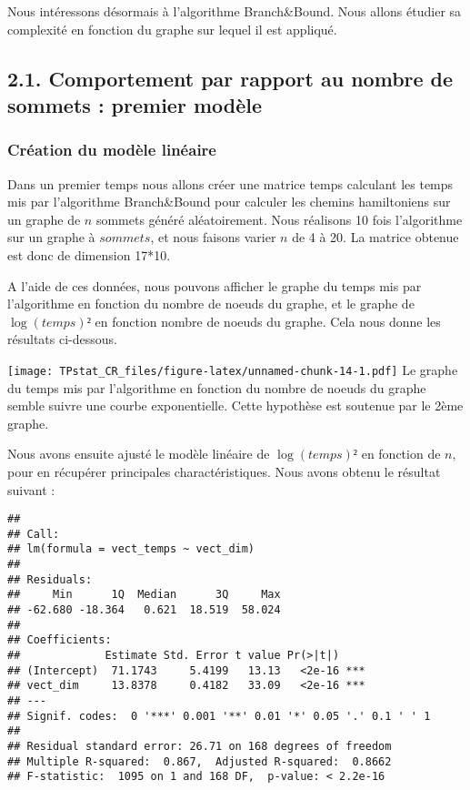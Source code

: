 \documentclass[
]{article}
\begin{document}
Nous intéressons désormais à l'algorithme Branch\&Bound. Nous allons
étudier sa complexité en fonction du graphe sur lequel il est appliqué.

\hypertarget{comportement-par-rapport-au-nombre-de-sommets-premier-moduxe8le}{%
\subsection{2.1. Comportement par rapport au nombre de sommets : premier
modèle}\label{comportement-par-rapport-au-nombre-de-sommets-premier-moduxe8le}}

\hypertarget{cruxe9ation-du-moduxe8le-linuxe9aire}{%
\subsubsection{Création du modèle
linéaire}\label{cruxe9ation-du-moduxe8le-linuxe9aire}}

Dans un premier temps nous allons créer une matrice temps calculant les
temps mis par l'algorithme Branch\&Bound pour calculer les chemins
hamiltoniens sur un graphe de \(n\) sommets généré aléatoirement. Nous
réalisons 10 fois l'algorithme sur un graphe à \(sommets\), et nous
faisons varier \(n\) de 4 à 20. La matrice obtenue est donc de dimension
17*10.

A l'aide de ces données, nous pouvons afficher le graphe du temps mis
par l'algorithme en fonction du nombre de noeuds du graphe, et le graphe
de \(\log(temps)²\) en fonction nombre de noeuds du graphe. Cela nous
donne les résultats ci-dessous.

\texttt{[image: TPstat\_CR\_files/figure-latex/unnamed-chunk-14-1.pdf]} Le
graphe du temps mis par l'algorithme en fonction du nombre de noeuds du
graphe semble suivre une courbe exponentielle. Cette hypothèse est
soutenue par le 2ème graphe.

Nous avons ensuite ajusté le modèle linéaire de \(\log(temps)²\) en
fonction de \(n\), pour en récupérer principales charactéristiques. Nous
avons obtenu le résultat suivant :

\begin{verbatim}
## 
## Call:
## lm(formula = vect_temps ~ vect_dim)
## 
## Residuals:
##     Min      1Q  Median      3Q     Max 
## -62.680 -18.364   0.621  18.519  58.024 
## 
## Coefficients:
##             Estimate Std. Error t value Pr(>|t|)    
## (Intercept)  71.1743     5.4199   13.13   <2e-16 ***
## vect_dim     13.8378     0.4182   33.09   <2e-16 ***
## ---
## Signif. codes:  0 '***' 0.001 '**' 0.01 '*' 0.05 '.' 0.1 ' ' 1
## 
## Residual standard error: 26.71 on 168 degrees of freedom
## Multiple R-squared:  0.867,  Adjusted R-squared:  0.8662 
## F-statistic:  1095 on 1 and 168 DF,  p-value: < 2.2e-16
\end{verbatim}
\end{document}

